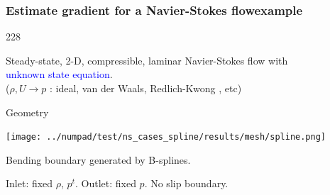 \documentclass{beamer}
\let\oldcite=\cite
\renewcommand{\cite}[1]{\textcolor[rgb]{.4,.4,.85}{\oldcite{#1}}}
\newcommand{\barrow}{\item[\color{darkred}\ding{228}]}
\newcommand{\carrow}{\item[\color{darkred}\ding{227}]}
\begin{document}
\begin{frame}
    \frametitle{Estimate gradient for a Navier-Stokes flow\hfill \scriptsize{example}} \small
    \begin{dinglist}{228}
        \barrow Steady-state, 2-D, compressible, laminar Navier-Stokes flow 
                with \\ \textcolor{blue}{unknown state equation}.\\
                ($\rho, U \rightarrow p$ : ideal, van der Waals, Redlich-Kwong
                \scriptsize \cite{Redlich 49} \small, etc)
    \barrow Geometry
    \vspace{-.2cm}
    \begin{center}
        \texttt{[image: ../numpad/test/ns\_cases\_spline/results/mesh/spline.png]}
    \end{center}
        \barrow Bending boundary generated by B-splines.
        \barrow Inlet: fixed $\rho$, $p^t$. Outlet: fixed $p$. No slip boundary.
    \end{dinglist}
\end{frame}

\end{document}
